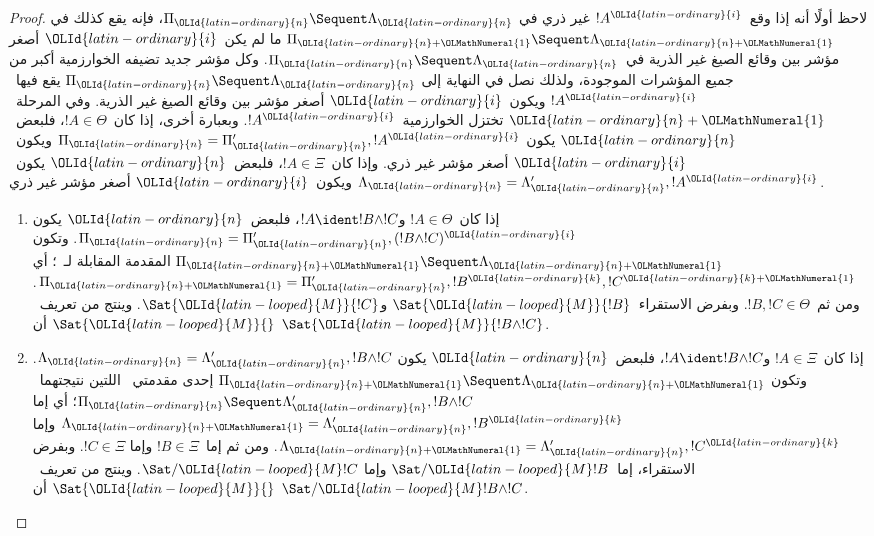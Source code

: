 \documentclass[../../../include/open-logic-section]{subfiles}
\begin{document}
\begin{proof}
لاحظ أولًا أنه إذا وقع~$!A^{\OLId{latin-ordinary}{i}}$ غير ذري في
$\Pi_{\OLId{latin-ordinary}{n}} \Sequent \Lambda_{\OLId{latin-ordinary}{n}}$، فإنه يقع كذلك في
$\Pi_{{\OLId{latin-ordinary}{n}}+{\OLMathNumeral{1}}} \Sequent \Lambda_{{\OLId{latin-ordinary}{n}}+{\OLMathNumeral{1}}}$ ما لم يكن~${\OLId{latin-ordinary}{i}}$ أصغر مؤشر بين وقائع
الصيغ غير الذرية في~$\Pi_{\OLId{latin-ordinary}{n}} \Sequent \Lambda_{\OLId{latin-ordinary}{n}}$. وكل مؤشر جديد تضيفه
الخوارزمية أكبر من جميع المؤشرات الموجودة، ولذلك نصل في النهاية إلى
$\Pi_{\OLId{latin-ordinary}{n}} \Sequent \Lambda_{\OLId{latin-ordinary}{n}}$ يقع فيها~$!A^{\OLId{latin-ordinary}{i}}$ ويكون~${\OLId{latin-ordinary}{i}}$ أصغر مؤشر بين
وقائع الصيغ غير الذرية. وفي المرحلة~${\OLId{latin-ordinary}{n}}+{\OLMathNumeral{1}}$ تختزل الخوارزمية~$!A^{\OLId{latin-ordinary}{i}}$.
وبعبارة أخرى، إذا كان~$!A\in\Theta$، فلبعض~${\OLId{latin-ordinary}{n}}$ يكون
$\Pi_{\OLId{latin-ordinary}{n}}=\Pi_{\OLId{latin-ordinary}{n}}',!A^{\OLId{latin-ordinary}{i}}$ ويكون~${\OLId{latin-ordinary}{i}}$ أصغر مؤشر غير ذري. وإذا كان~$!A\in\Xi$،
فلبعض~${\OLId{latin-ordinary}{n}}$ يكون~$\Lambda_{\OLId{latin-ordinary}{n}}=\Lambda_{\OLId{latin-ordinary}{n}}',!A^{\OLId{latin-ordinary}{i}}$ ويكون~${\OLId{latin-ordinary}{i}}$ أصغر مؤشر غير ذري.

\begin{enumerate}
  \item إذا كان~$!A\in\Theta$ و$!A\ident !B\land !C$، فلبعض~${\OLId{latin-ordinary}{n}}$ يكون
  $\Pi_{\OLId{latin-ordinary}{n}}=\Pi_{\OLId{latin-ordinary}{n}}',(!B\land !C)^{\OLId{latin-ordinary}{i}}$. وتكون
  $\Pi_{{\OLId{latin-ordinary}{n}}+{\OLMathNumeral{1}}}\Sequent\Lambda_{{\OLId{latin-ordinary}{n}}+{\OLMathNumeral{1}}}$ المقدمة المقابلة لـ~\LeftR{\land}؛ أي
  $\Pi_{{\OLId{latin-ordinary}{n}}+{\OLMathNumeral{1}}}=\Pi_{\OLId{latin-ordinary}{n}}',!B^{\OLId{latin-ordinary}{k}},!C^{{\OLId{latin-ordinary}{k}}+{\OLMathNumeral{1}}}$. ومن ثم~$!B,!C\in\Theta$. وبفرض
  الاستقراء~$\Sat{{\OLId{latin-looped}{M}}}{!B}$ و$\Sat{{\OLId{latin-looped}{M}}}{!C}$. وينتج من تعريف~$\Sat{{\OLId{latin-looped}{M}}}{}$ أن
  $\Sat{{\OLId{latin-looped}{M}}}{!B\land !C}$.

  \item إذا كان~$!A\in\Xi$ و$!A\ident !B\land !C$، فلبعض~${\OLId{latin-ordinary}{n}}$ يكون
  $\Lambda_{\OLId{latin-ordinary}{n}}=\Lambda_{\OLId{latin-ordinary}{n}}',!B\land !C$. وتكون
  $\Pi_{{\OLId{latin-ordinary}{n}}+{\OLMathNumeral{1}}}\Sequent\Lambda_{{\OLId{latin-ordinary}{n}}+{\OLMathNumeral{1}}}$ إحدى مقدمتي~\RightR{\land} اللتين
  نتيجتهما~$\Pi_{\OLId{latin-ordinary}{n}}\Sequent\Lambda_{\OLId{latin-ordinary}{n}}',!B\land !C$؛ أي إما
  $\Lambda_{{\OLId{latin-ordinary}{n}}+{\OLMathNumeral{1}}}=\Lambda_{\OLId{latin-ordinary}{n}}',!B^{\OLId{latin-ordinary}{k}}$ وإما
  $\Lambda_{{\OLId{latin-ordinary}{n}}+{\OLMathNumeral{1}}}=\Lambda_{\OLId{latin-ordinary}{n}}',!C^{\OLId{latin-ordinary}{k}}$. ومن ثم إما~$!B\in\Xi$ وإما
  $!C\in\Xi$. وبفرض الاستقراء، إما~$\Sat/{{\OLId{latin-looped}{M}}}{!B}$ وإما
  $\Sat/{{\OLId{latin-looped}{M}}}{!C}$. وينتج من تعريف~$\Sat{{\OLId{latin-looped}{M}}}{}$ أن
  $\Sat/{{\OLId{latin-looped}{M}}}{!B\land !C}$.
  

\end{enumerate}
\end{proof}
\end{document}
